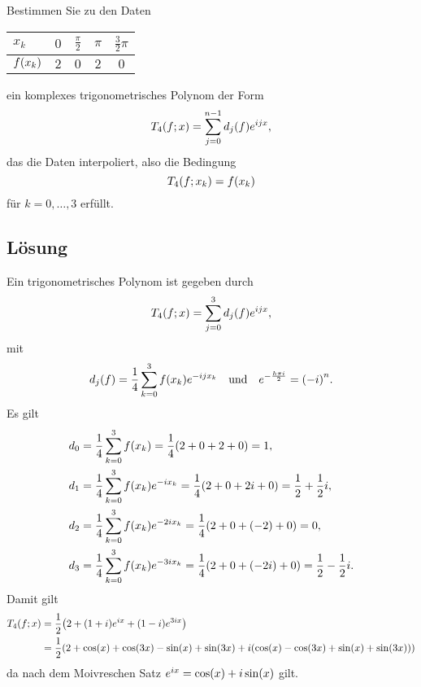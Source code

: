 \documentclass{exercise}
\begin{document}
    \begin{problem}
        Bestimmen Sie zu den Daten
        \begin{center}
            \begin{tabular}{lcccc}
                \toprule
                \(x_k\) & \(0\) & \(\frac{\pi}{2}\) & \(\pi\) & \(\frac{3}{2}\pi\)\\
                \midrule
                \(f\parentheses*{x_k}\) & \(2\) & \(0\) & \(2\) & \(0\)\\
                \bottomrule
            \end{tabular}
        \end{center}
        ein komplexes trigonometrisches Polynom der Form
        \[
            T_4\parentheses*{f; x} = \sum_{j = 0}^{n - 1}d_j\parentheses*{f}e^{ijx},
        \]
        das die Daten interpoliert, also die Bedingung
        \[
            T_4\parentheses*{f; x_k} = f\parentheses*{x_k}
        \]
        für \(k = 0, \ldots, 3\) erfüllt.
    \end{problem}
    
    \subsection*{Lösung}
    Ein trigonometrisches Polynom ist gegeben durch
    \[
        T_4\parentheses*{f; x} = \sum_{j = 0}^3 d_j\parentheses*{f}e^{ijx},
    \]
    mit
    \[
        d_j\parentheses*{f} = \frac{1}{4}\sum_{k = 0}^3 f\parentheses*{x_k}e^{-ijx_k} \quad \text{und} \quad e^{-\frac{h\pi i}{2}} = \parentheses*{-i}^n.
    \]
    Es gilt
    \begin{align*}
        d_0 &= \frac{1}{4}\sum_{k = 0}^3 f\parentheses*{x_k} = \frac{1}{4}\parentheses*{2 + 0 + 2 + 0} = 1,\\
        d_1 &= \frac{1}{4}\sum_{k = 0}^3 f\parentheses*{x_k}e^{-ix_k} = \frac{1}{4}\parentheses*{2 + 0 + 2i + 0} = \frac{1}{2} + \frac{1}{2}i,\\
        d_2 &= \frac{1}{4}\sum_{k = 0}^3 f\parentheses*{x_k}e^{-2ix_k} = \frac{1}{4}\parentheses*{2 + 0 + \parentheses*{-2} + 0} = 0,\\
        d_3 &= \frac{1}{4}\sum_{k = 0}^3 f\parentheses*{x_k}e^{-3ix_k} = \frac{1}{4}\parentheses*{2 + 0 + \parentheses*{-2i} + 0} = \frac{1}{2} - \frac{1}{2}i.
    \end{align*}
    Damit gilt
    \begin{align*}
        T_4\parentheses*{f; x} &= \frac{1}{2}\parentheses*{2 + \parentheses*{1 + i}e^{ix} + \parentheses*{1 - i}e^{3ix}}\\
        &= \frac{1}{2}\parentheses*{2 + \cos\parentheses*{x} + \cos\parentheses*{3x} - \sin\parentheses*{x} + \sin\parentheses*{3x} + i\parentheses*{\cos\parentheses*{x} - \cos\parentheses*{3x} + \sin\parentheses*{x} + \sin\parentheses*{3x}}}
    \end{align*}
    da nach dem Moivreschen Satz \(e^{ix} = \cos\parentheses*{x} + i\sin\parentheses*{x}\) gilt.
\end{document}
